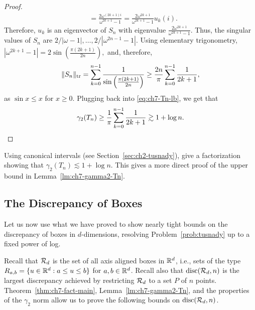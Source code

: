 \begin{proof}
\begin{align*}
    &= \frac{2\omega^{(2k + 1)i}}{\omega^{2k + 1}-1}
      = \frac{2\omega^{2k + 1}}{\omega^{2k + 1}-1}u_k(i).
  \end{align*}
  Therefore, $u_k$ is an eigenvector of $S_n$ with eigenvalue
  $\frac{2\omega^{2k + 1}}{\omega^{2k + 1}-1}$. Thus, the
  singular values of $S_n$ are $2/|\omega - 1|,
  \ldots, 2/|\omega^{2n-1} - 1|$. Using elementary
  trigonometry,
  \(
  |\omega^{2k + 1} - 1| = 2\sin\left(\frac{\pi(2k+1)}{2n}\right),
  \)
  and, therefore,
  \[
    \|S_n\|_{\operatorname{tr}} = \sum_{k = 0}^{n-1} \frac{1}{\sin\left(\frac{\pi(2k+1)}{2n}\right)}
    \ge
    \frac{2n}{\pi}\sum_{k = 0}^{n-1} \frac{1}{2k+1},
  \]
  as $\sin x \le x$ for $x \ge 0$.
  Plugging back into \eqref{eq:ch7-Tn-lb}, we get that
  \[
    \gamma_2(T_n) \ge \frac{1}{\pi}\sum_{k = 0}^{n-1} \frac{1}{2k+1}
    \gtrsim 1 + \log n. \qedhere
  \]
\end{proof}

\begin{exercise}
  Using canonical intervals (see Section~\ref{sec:ch2-tusnady}), give a factorization
  showing that $\gamma_2(T_n) \lesssim 1 + \log n$. This gives a more
  direct proof of the upper bound in Lemma~\ref{lm:ch7-gamma2-Tn}.
\end{exercise}

\subsection{The Discrepancy of Boxes}

Let us now use what we have proved to show nearly tight bounds on the
discrepancy of boxes in $d$-dimensions, resolving
Problem~\ref{prob:tusnady} up to a fixed power of log.

Recall that
$\mathcal{R}_d$ is the set of all axis aligned boxes in $\mathbb{R}^d$, i.e., sets of
the type $R_{a,b} = \{u \in \mathbb{R}^d: a \le u \le b\}$ for $a,b \in
\mathbb{R}^d$. Recall also that $\operatorname{disc}(\mathcal{R}_d, n)$ is the largest discrepancy
achieved by restricting $\mathcal{R}_d$ to a set $P$ of $n$
points. Theorem~\ref{thm:ch7-fact-main}, Lemma~\ref{lm:ch7-gamma2-Tn},
and the properties of the $\gamma_2$ norm allow us to prove the
following bounds on $\operatorname{disc}(\mathcal{R}_d,n)$.

